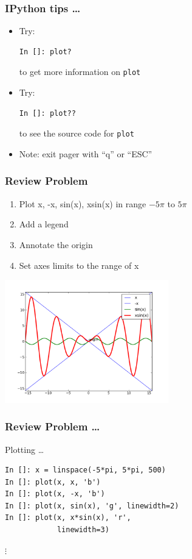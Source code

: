 \documentclass[14pt,compress]{beamer}
\newcommand{\typ}[1]{\lstinline{#1}}
\begin{document}
\begin{frame}[fragile]
\frametitle{IPython tips \ldots}

\begin{itemize}

    \item Try:
\begin{lstlisting}
In []: plot?
\end{lstlisting}
        to get more information on \typ{plot} 

        \vspace*{0.5in}
    \item Try: 
\begin{lstlisting}
In []: plot??
\end{lstlisting}
    to see the source code for \typ{plot}

\item Note: exit pager with ``q'' or ``ESC''
\end{itemize}

\end{frame}


\begin{frame}[fragile]
\frametitle{Review Problem}
\begin{enumerate}
\item Plot x, -x, sin(x), xsin(x) in range $-5\pi$ to $5\pi$
\item Add a legend
\item Annotate the origin
\item Set axes limits to the range of x
\end{enumerate}
\vspace*{-0.1in}
\begin{center}
  \includegraphics[height=2.1in, interpolate=true]{data/four_plot}  
\end{center}
\end{frame}

\begin{frame}[fragile]
\frametitle{Review Problem \ldots}
\alert{Plotting \ldots}
\begin{lstlisting}
In []: x = linspace(-5*pi, 5*pi, 500)
In []: plot(x, x, 'b')
In []: plot(x, -x, 'b')
In []: plot(x, sin(x), 'g', linewidth=2)
In []: plot(x, x*sin(x), 'r', 
            linewidth=3)
\end{lstlisting}
$\vdots$
\end{frame}
\end{document}

